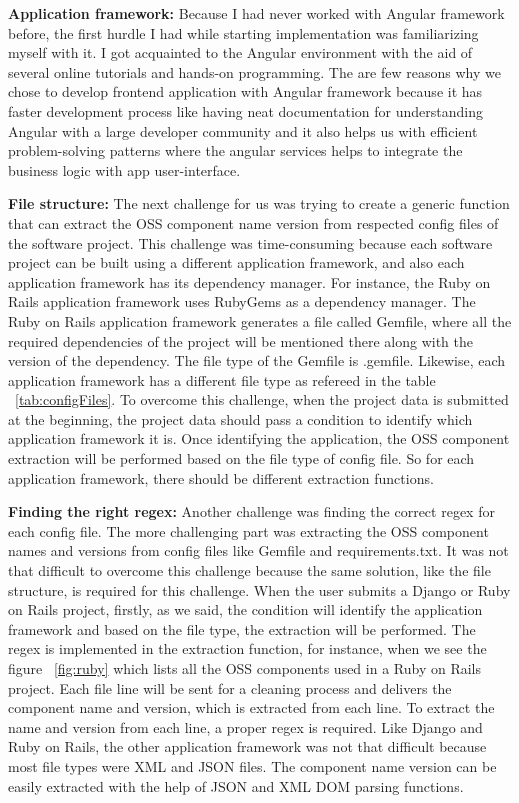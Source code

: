 \textbf{Application framework:} Because I had never worked with Angular framework before, the first hurdle I had while starting implementation was familiarizing myself with it. I got acquainted to the Angular environment with the aid of several online tutorials and hands-on programming. The are few reasons why we chose to develop frontend application with  Angular framework because it has faster development process like having neat documentation for understanding Angular with a large developer community and it also helps us with efficient problem-solving patterns where the angular services helps to integrate the business logic with app user-interface.
	
\textbf{File structure:} The next challenge for us was trying to create a generic function that can extract the \acs{OSS} component name version from respected config files of the software project. This challenge was time-consuming because each software project can be built using a different application framework, and also each application framework has its dependency manager. For instance, the Ruby on Rails application framework uses RubyGems as a dependency manager. The Ruby on Rails application framework generates a file called Gemfile, where all the required dependencies of the project will be mentioned there along with the version of the dependency. The file type of the Gemfile is .gemfile.  Likewise, each application framework has a different file type as refereed in the table ~\ref{tab:configFiles}. To overcome this challenge, when the project data is submitted at the beginning, the project data should pass a condition to identify which application framework it is. Once identifying the application, the OSS component extraction will be performed based on the file type of config file. So for each application framework, there should be different extraction functions. 
		
\textbf{Finding the right regex:} Another challenge was finding the correct regex for each config file. The more challenging part was extracting the \acs{OSS} component names and versions from config files like Gemfile and requirements.txt. It was not that difficult to overcome this challenge because the same solution, like the file structure, is required for this challenge. When the user submits a Django or Ruby on Rails project, firstly, as we said, the condition will identify the application framework and based on the file type, the extraction will be performed. The regex is implemented in the extraction function, for instance, when we see the figure ~\ref{fig:ruby} which lists all the OSS components used in a Ruby on Rails project. Each file line will be sent for a cleaning process and delivers the component name and version, which is extracted from each line. To extract the name and version from each line, a proper regex is required. Like Django and Ruby on Rails, the other application framework was not that difficult because most file types were XML and JSON files. The component name version can be easily extracted with the help of JSON and XML DOM parsing functions.  
	
